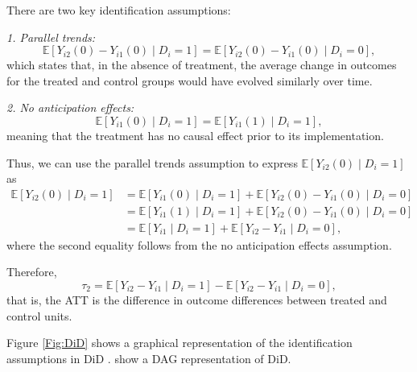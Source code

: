 There are two key identification assumptions:

\textit{1. Parallel trends:}
\begin{equation}
	\mathbb{E}[Y_{i2}(0) - Y_{i1}(0) \mid D_i = 1] = \mathbb{E}[Y_{i2}(0) - Y_{i1}(0) \mid D_i = 0],
\end{equation}
which states that, in the absence of treatment, the average change in outcomes for the treated and control groups would have evolved similarly over time.

\textit{2. No anticipation effects:}
\begin{equation}
	\mathbb{E}[Y_{i1}(0)\mid D_i=1] = \mathbb{E}[Y_{i1}(1)\mid D_i=1],
\end{equation}
meaning that the treatment has no causal effect prior to its implementation.

Thus, we can use the parallel trends assumption to express \( \mathbb{E}[Y_{i2}(0) \mid D_i = 1] \) as
\begin{align*}
	\mathbb{E}[Y_{i2}(0)\mid D_i = 1] 
	&= \mathbb{E}[Y_{i1}(0) \mid D_i = 1] + \mathbb{E}[Y_{i2}(0) - Y_{i1}(0) \mid D_i = 0] \\
	&= \mathbb{E}[Y_{i1}(1) \mid D_i = 1] + \mathbb{E}[Y_{i2}(0) - Y_{i1}(0) \mid D_i = 0] \\
	&= \mathbb{E}[Y_{i1} \mid D_i = 1] + \mathbb{E}[Y_{i2} - Y_{i1} \mid D_i = 0],
\end{align*}
where the second equality follows from the no anticipation effects assumption.

Therefore,
\begin{equation}\label{eq:DiD}
\tau_2 = \mathbb{E}[Y_{i2} - Y_{i1} \mid D_i = 1] - \mathbb{E}[Y_{i2} - Y_{i1} \mid D_i = 0],
\end{equation}
that is, the ATT is the difference in outcome differences between treated and control units. 

Figure \ref{Fig:DiD} shows a graphical representation of the identification assumptions in DiD \cite{chernozhukov2024applied}. \cite{normington2022bayesian} show a DAG representation of DiD.

